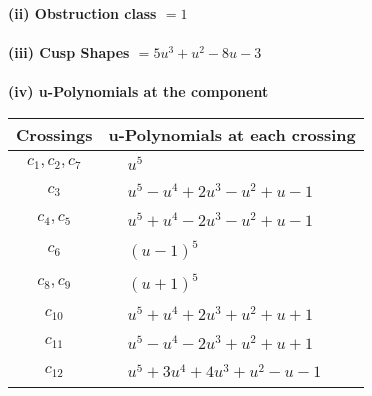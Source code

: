 \documentclass[1p]{elsarticle_modified}
\theoremstyle{definition}
\begin{document}
\flushleft \textbf{(ii) Obstruction class $= 1$}\\~\\
\flushleft \textbf{(iii) Cusp Shapes $= 5 u^3+u^2-8 u-3$}\\~\\
\newpage\renewcommand{\arraystretch}{1}
\flushleft \textbf{(iv) u-Polynomials at the component}\newline \\
\begin{tabular}{m{50pt}|m{274pt}}
Crossings & \hspace{64pt}u-Polynomials at each crossing \\
\hline $$\begin{aligned}c_{1},c_{2},c_{7}\end{aligned}$$&$\begin{aligned}
&u^5
\end{aligned}$\\
\hline $$\begin{aligned}c_{3}\end{aligned}$$&$\begin{aligned}
&u^5- u^4+2 u^3- u^2+u-1
\end{aligned}$\\
\hline $$\begin{aligned}c_{4},c_{5}\end{aligned}$$&$\begin{aligned}
&u^5+u^4-2 u^3- u^2+u-1
\end{aligned}$\\
\hline $$\begin{aligned}c_{6}\end{aligned}$$&$\begin{aligned}
&(u-1)^5
\end{aligned}$\\
\hline $$\begin{aligned}c_{8},c_{9}\end{aligned}$$&$\begin{aligned}
&(u+1)^5
\end{aligned}$\\
\hline $$\begin{aligned}c_{10}\end{aligned}$$&$\begin{aligned}
&u^5+u^4+2 u^3+u^2+u+1
\end{aligned}$\\
\hline $$\begin{aligned}c_{11}\end{aligned}$$&$\begin{aligned}
&u^5- u^4-2 u^3+u^2+u+1
\end{aligned}$\\
\hline $$\begin{aligned}c_{12}\end{aligned}$$&$\begin{aligned}
&u^5+3 u^4+4 u^3+u^2- u-1
\end{aligned}$\\
\hline
\end{tabular}\\~\\
\end{document}
